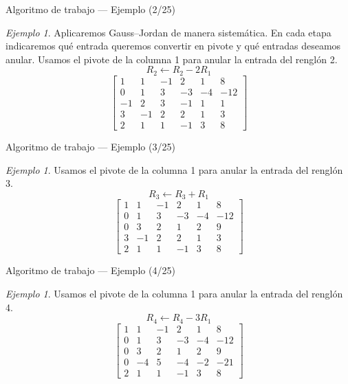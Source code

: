 \documentclass[aspectratio=169,11pt]{beamer}
\theoremstyle{remark}
\newtheorem{Ejem}[definicion]{Ejemplo}
\begin{document}
\begin{frame}{Algoritmo de trabajo — Ejemplo (2/25)}
\begin{Ejem}
Aplicaremos Gauss--Jordan de manera sistemática. En cada etapa indicaremos qué entrada queremos convertir en pivote y qué entradas deseamos anular. Usamos el pivote de la columna 1 para anular la entrada del renglón 2.
\[
R_{2}\leftarrow R_{2}-2R_{1}
\]
\[
\left[\begin{array}{ccccc|c}
1 & 1 & -1 & 2 & 1 & 8\\
0 & 1 & 3 & -3 & -4 & -12\\
-1 & 2 & 3 & -1 & 1 & 1\\
3 & -1 & 2 & 2 & 1 & 3\\
2 & 1 & 1 & -1 & 3 & 8
\end{array}\right]
\]
\end{Ejem}
\end{frame}

\begin{frame}{Algoritmo de trabajo — Ejemplo (3/25)}
\begin{Ejem}
Usamos el pivote de la columna 1 para anular la entrada del renglón 3.
\[
R_{3}\leftarrow R_{3}+R_{1}
\]
\[
\left[\begin{array}{ccccc|c}
1 & 1 & -1 & 2 & 1 & 8\\
0 & 1 & 3 & -3 & -4 & -12\\
0 & 3 & 2 & 1 & 2 & 9\\
3 & -1 & 2 & 2 & 1 & 3\\
2 & 1 & 1 & -1 & 3 & 8
\end{array}\right]
\]
\end{Ejem}
\end{frame}

\begin{frame}{Algoritmo de trabajo — Ejemplo (4/25)}
\begin{Ejem}
Usamos el pivote de la columna 1 para anular la entrada del renglón 4.
\[
R_{4}\leftarrow R_{4}-3R_{1}
\]
\[
\left[\begin{array}{ccccc|c}
1 & 1 & -1 & 2 & 1 & 8\\
0 & 1 & 3 & -3 & -4 & -12\\
0 & 3 & 2 & 1 & 2 & 9\\
0 & -4 & 5 & -4 & -2 & -21\\
2 & 1 & 1 & -1 & 3 & 8
\end{array}\right]
\]
\end{Ejem}
\end{frame}
\end{document}
